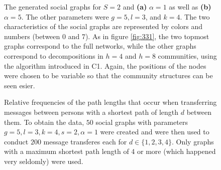 \documentclass{scrartcl}
\begin{document}
\begin{figure}
    \centering
    \def\svgwidth{0.9\textwidth}
    
    \caption{The generated social graphs for $S=2$ and \textbf{(a)} $\alpha
    = 1$ as well as \textbf{(b)} $\alpha = 5$. The other parameters were 
    $g = 5, l = 3$, and $k = 4$. The two characteristics of
    the social graphs are represented by colors and numbers (between 0 and
    7).  As in figure \ref{fig:331}, the two topmost graphs correspond to
    the full networks, while the other graphs correspond to decompositions
    in $h = 4$ and $h = 8$ communities, using the algorithm introduced in C1.
    Again, the positions of the nodes were chosen to be variable so that
    the community structures can be seen esier.}
    \label{fig:332}
\end{figure}


\begin{figure}[bcht]
    \centering
    \caption{Relative frequencies of the path lengths that occur when
        transferring messages between persons with a shortest path of
        length $d$ between them. To obtain the data, $50$ social graphs
        with parameters $g = 5, l = 3, k = 4, s = 2, \alpha = 1$ were
        created and were then used to conduct $200$ message transferes each
        for $d\in\{1, 2, 3, 4\}$.  Only graphs with a maximum shortest path
        length of 4 or more (which happened very seldomly) were used. }
    \label{fig:12_mod}
\end{figure}
\end{document}
